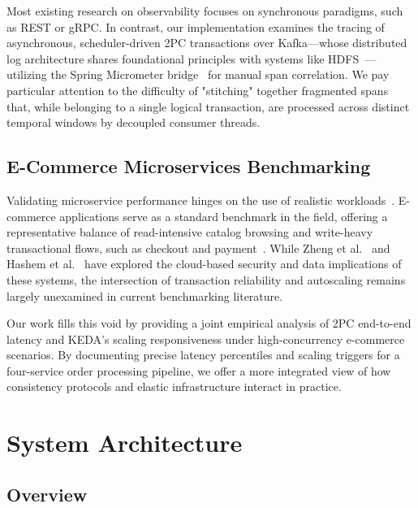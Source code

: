 Most existing research on observability focuses on synchronous paradigms, such as REST or gRPC. In contrast, our implementation examines the tracing of asynchronous, scheduler-driven 2PC transactions over Kafka—whose distributed log architecture shares foundational principles with systems like HDFS~\cite{kreps2013log}—utilizing the Spring Micrometer bridge~\cite{micrometer2024} for manual span correlation. We pay particular attention to the difficulty of "stitching" together fragmented spans that, while belonging to a single logical transaction, are processed across distinct temporal windows by decoupled consumer threads.

\subsection{E-Commerce Microservices Benchmarking}
\label{subsec:rw-benchmarking}

Validating microservice performance hinges on the use of realistic workloads~\cite{ueda2016workload}. E-commerce applications serve as a standard benchmark in the field, offering a representative balance of read-intensive catalog browsing and write-heavy transactional flows, such as checkout and payment~\cite{gan2019deathstar}. While Zheng et al.~\cite{zheng2019survey} and Hashem et al.~\cite{hashem2015rise} have explored the cloud-based security and data implications of these systems, the intersection of transaction reliability and autoscaling remains largely unexamined in current benchmarking literature. 

Our work fills this void by providing a joint empirical analysis of 2PC end-to-end latency and KEDA’s scaling responsiveness under high-concurrency e-commerce scenarios. By documenting precise latency percentiles and scaling triggers for a four-service order processing pipeline, we offer a more integrated view of how consistency protocols and elastic infrastructure interact in practice.


\section{System Architecture}
\label{sec:architecture}

\subsection{Overview}
\label{subsec:overview}

